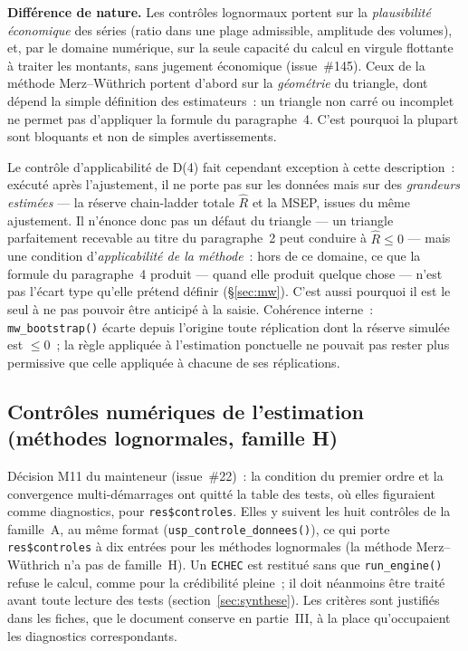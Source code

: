 \documentclass[a4paper,11pt]{article}
\newcommand{\code}[1]{\texttt{\small #1}}
\begin{document}
\medskip
\begin{encadre}
\textbf{Différence de nature.} Les contrôles lognormaux portent sur la
\emph{plausibilité économique} des séries (ratio dans une plage admissible,
amplitude des volumes), et, par le domaine numérique, sur la seule capacité du calcul en
virgule flottante à traiter les montants, sans jugement économique (issue~\#145). Ceux de la méthode Merz--Wüthrich portent d'abord sur la
\emph{géométrie} du triangle, dont dépend la simple définition des estimateurs~:
un triangle non carré ou incomplet ne permet pas d'appliquer la formule du
paragraphe~4. C'est pourquoi la plupart sont bloquants et non de simples
avertissements.

\smallskip
Le contrôle d'applicabilité de D(4) fait cependant exception à cette
description~: exécuté après l'ajustement, il ne porte pas sur les données
mais sur des \emph{grandeurs estimées} --- la réserve chain-ladder totale
$\hat R$ et la MSEP, issues du même ajustement. Il n'énonce donc pas un défaut
du triangle --- un triangle
parfaitement recevable au titre du paragraphe~2 peut conduire à $\hat R \le 0$
--- mais une condition d'\emph{applicabilité de la méthode}~: hors de ce domaine, ce que
la formule du paragraphe~4 produit --- quand elle produit quelque chose ---
n'est pas l'écart type qu'elle prétend définir (§\ref{sec:mw}). C'est aussi pourquoi il est le seul
à ne pas pouvoir être anticipé à la saisie.
Cohérence interne~: \code{mw\_bootstrap()} écarte depuis l'origine toute
réplication dont la réserve simulée est $\le 0$~; la règle appliquée à l'estimation ponctuelle ne
pouvait pas rester plus permissive que celle appliquée à chacune de ses
réplications.
\end{encadre}

\subsection*{Contrôles numériques de l'estimation (méthodes lognormales, famille H)}

Décision M11 du mainteneur (issue~\#22)~: la condition du premier ordre et la convergence
multi-démarrages ont quitté la table des tests, où elles figuraient comme diagnostics, pour
\code{res\$controles}. Elles y suivent les huit contrôles de la famille~A, au même format
(\code{usp\_controle\_donnees()}), ce qui porte \code{res\$controles} à dix entrées pour les
méthodes lognormales (la méthode Merz--Wüthrich n'a pas de famille~H). Un \code{ECHEC} est
restitué sans que \code{run\_engine()} refuse le calcul, comme pour la crédibilité pleine~;
il doit néanmoins être traité avant toute lecture des tests (section~\ref{sec:synthese}). Les
critères sont justifiés dans les fiches, que le document conserve en partie~III, à la place
qu'occupaient les diagnostics correspondants.
\end{document}
